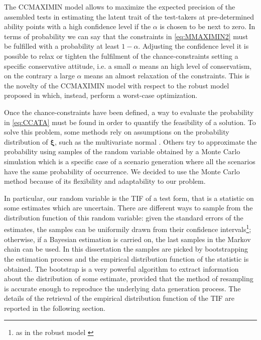 The CCMAXIMIN model allows to maximize the expected precision of the assembled tests in estimating the latent trait of the test-takers at pre-determined ability points with a high  confidence level if the $\alpha$ is chosen to be next to zero. In terms of probability we can say that the constraints in \eqref{eq:MMAXIMIN2} must be fulfilled with a probability at least $1-\alpha$. Adjusting the confidence level it is possible to relax or tighten the fulfilment of the chance-constraints setting a specific conservative attitude, i.e. a small $\alpha$ means an high level of conservatism, on the contrary a large $\alpha$ means an almost relaxation of the constraints. This is the novelty of the CCMAXIMIN model with respect to the robust model proposed in \textcite{veldkamp2013application,veldkamp2013uncertainties} which, instead, perform a worst-case optimization. 

Once the chance-constraints have been defined, a way to evaluate the probability in \eqref{eq:CCATA} must be found in order to quantify the feasibility of a solution. To solve this problem, some methods rely on assumptions on the probability distribution of $\boldsymbol{\xi}$, such as the multivariate normal \parencite{kim1990deterministic}. Others try to approximate the probability using samples of the random variable obtained by a Monte Carlo simulation \parencite{Ahmed2008} which is a specific case of a scenario generation where all the scenarios have the same probability of occurrence. 
We decided to use the Monte Carlo method because of its flexibility and adaptability to our problem. 

In particular, our random variable is the TIF of a test form, that  is a statistic on some estimates which are uncertain. There are different ways to sample from the distribution function of this random variable: given the standard errors of the estimates, the samples can be uniformily drawn from their confidence intervals\footnote{as in the robust model \parencite{veldkamp2013application}}; otherwise, if a Bayesian estimation is carried on, the last samples in the Markov chain can be used. In this dissertation the samples are picked by bootstrapping the estimation process and the empirical distribution function of the statistic is obtained. The bootstrap \parencite{efron1993} is a very powerful algorithm to extract information about the distribution of some estimate, provided that the method of resampling is accurate enough to reproduce the underlying data generation process. The details of the retrieval of the empirical distribution function of the TIF are reported in the following section.

